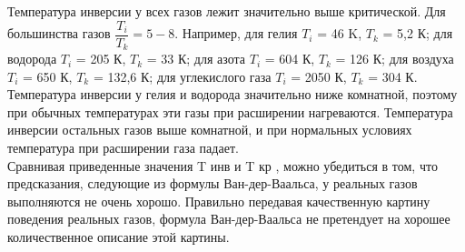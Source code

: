 \documentclass[12pt,a4paper]{article}
\begin{document}
	Температура инверсии у всех газов лежит значительно выше критической. Для большинства газов $\dfrac{T_i}{T_k} = 5 - 8$. Например, для гелия $T_i$ = 46 K, $T_k$ = 5,2 К; для водорода $T_i$ = 205 К, $T_k$ = 33 К; для азота $T_i$ = 604 К, $T_k$ = 126 К; для воздуха $T_i$ = 650 К, $T_k$ = 132,6 К; для углекислого газа $T_i$ = 2050 К, $T_k$ = 304 К. Температура инверсии у гелия и водорода значительно ниже комнатной, поэтому при обычных температурах эти газы при расширении нагреваются. Температура инверсии остальных газов выше комнатной, и при нормальных условиях температура при расширении газа падает.\\
	
	Сравнивая приведенные значения T инв и T кр , можно убедиться в том, что предсказания, следующие из формулы Ван-дер-Ваальса, у реальных газов выполняются не очень хорошо. Правильно передавая качественную картину поведения реальных газов, формула Ван-дер-Ваальса не претендует на хорошее количественное описание этой картины.\\
	
\end{document}
